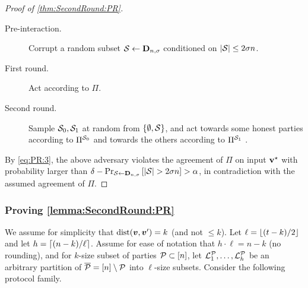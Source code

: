 \begin{proof}[Proof of \cref{thm:SecondRound:PR}]
{\begin{algorithm}[$\Ac$]
		\begin{description}
			\item[Pre-interaction.]
			
			Corrupt a random subset $\mathcal{S} \gets \mathbf{D}_{n,\sigma} $ conditioned on $ \left|{\cal{S}}\right| \le 2\sigma n$.
			
			\item[First round.] Act according to $\Pi$.
			
			\item[Second round.] Sample  ${\cal{S}}_0,{\cal{S}}_1$ at random from $\left\{\emptyset,{\cal{S}}\right\}$, and act towards some honest parties according to $\Pi^{{\cal{S}}_0}$  and towards the others according to  $\Pi^{{\cal{S}}_1}$ .
		\end{description}
	\end{algorithm}
}
By \cref{eq:PR:3}, the above adversary violates the agreement of $\Pi$ on input $\mathbf{v}^{\star}$ with probability larger than $\delta - \Pr_{{\cal{S}} \gets \mathbf{D}_{n,\sigma}}\left[\left|{\cal{S}}\right| >2\sigma n\right] >\alpha$, in contradiction with the assumed agreement of $\Pi$.
\end{proof}


\newcommand{\VV}{\cV^{\cP}}
\renewcommand{\PP}{\Pi^{\cP,\cS}}
\newcommand{\ops}{{\overline{\cP \cup \cS}}}

\subsubsection{Proving \cref{lemma:SecondRound:PR}}\label{sec:lemma:SecondRound:PR}
We  assume for simplicity that $\mathrm{dist}({ \boldsymbol{v}},{ \boldsymbol{v}}')=k$ (and not $\le k$). Let $\ell= \left \lfloor(t -k)/2 \right \rfloor$ and let $h = \left\lceil (n-k)/\ell \right\rceil$.  Assume for ease of notation that $h\cdot \ell = n-k $ (\ie no rounding), and for  $k$-size subset of parties $\mathcal{P} \subset [n]$, let $ {\cal{L}}^{\mathcal{P}}_1,\dots,{\cal{L}}_h^{\mathcal{P}}$ be an arbitrary  partition of ${\overline{\mathcal{P}}} = [n] \setminus \mathcal{P}$ into $\ell$-size subsets. Consider the following protocol family.


